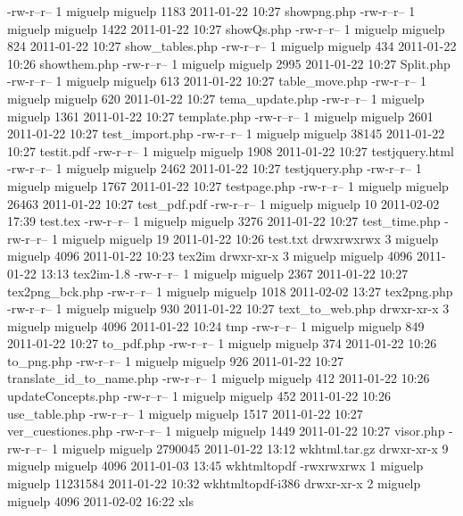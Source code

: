 -rw-r--r--  1 miguelp miguelp     1183 2011-01-22 10:27 showpng.php
-rw-r--r--  1 miguelp miguelp     1422 2011-01-22 10:27 showQs.php
-rw-r--r--  1 miguelp miguelp      824 2011-01-22 10:27 show_tables.php
-rw-r--r--  1 miguelp miguelp      434 2011-01-22 10:26 showthem.php
-rw-r--r--  1 miguelp miguelp     2995 2011-01-22 10:27 Split.php
-rw-r--r--  1 miguelp miguelp      613 2011-01-22 10:27 table_move.php
-rw-r--r--  1 miguelp miguelp      620 2011-01-22 10:27 tema_update.php
-rw-r--r--  1 miguelp miguelp     1361 2011-01-22 10:27 template.php
-rw-r--r--  1 miguelp miguelp     2601 2011-01-22 10:27 test_import.php
-rw-r--r--  1 miguelp miguelp    38145 2011-01-22 10:27 testit.pdf
-rw-r--r--  1 miguelp miguelp     1908 2011-01-22 10:27 testjquery.html
-rw-r--r--  1 miguelp miguelp     2462 2011-01-22 10:27 testjquery.php
-rw-r--r--  1 miguelp miguelp     1767 2011-01-22 10:27 testpage.php
-rw-r--r--  1 miguelp miguelp    26463 2011-01-22 10:27 test_pdf.pdf
-rw-r--r--  1 miguelp miguelp       10 2011-02-02 17:39 test.tex
-rw-r--r--  1 miguelp miguelp     3276 2011-01-22 10:27 test_time.php
-rw-r--r--  1 miguelp miguelp       19 2011-01-22 10:26 test.txt
drwxrwxrwx  3 miguelp miguelp     4096 2011-01-22 10:23 tex2im
drwxr-xr-x  3 miguelp miguelp     4096 2011-01-22 13:13 tex2im-1.8
-rw-r--r--  1 miguelp miguelp     2367 2011-01-22 10:27 tex2png_bck.php
-rw-r--r--  1 miguelp miguelp     1018 2011-02-02 13:27 tex2png.php
-rw-r--r--  1 miguelp miguelp      930 2011-01-22 10:27 text_to_web.php
drwxr-xr-x  3 miguelp miguelp     4096 2011-01-22 10:24 tmp
-rw-r--r--  1 miguelp miguelp      849 2011-01-22 10:27 to_pdf.php
-rw-r--r--  1 miguelp miguelp      374 2011-01-22 10:26 to_png.php
-rw-r--r--  1 miguelp miguelp      926 2011-01-22 10:27 translate_id_to_name.php
-rw-r--r--  1 miguelp miguelp      412 2011-01-22 10:26 updateConcepts.php
-rw-r--r--  1 miguelp miguelp      452 2011-01-22 10:26 use_table.php
-rw-r--r--  1 miguelp miguelp     1517 2011-01-22 10:27 ver_cuestiones.php
-rw-r--r--  1 miguelp miguelp     1449 2011-01-22 10:27 visor.php
-rw-r--r--  1 miguelp miguelp  2790045 2011-01-22 13:12 wkhtml.tar.gz
drwxr-xr-x  9 miguelp miguelp     4096 2011-01-03 13:45 wkhtmltopdf
-rwxrwxrwx  1 miguelp miguelp 11231584 2011-01-22 10:32 wkhtmltopdf-i386
drwxr-xr-x  2 miguelp miguelp     4096 2011-02-02 16:22 xls
